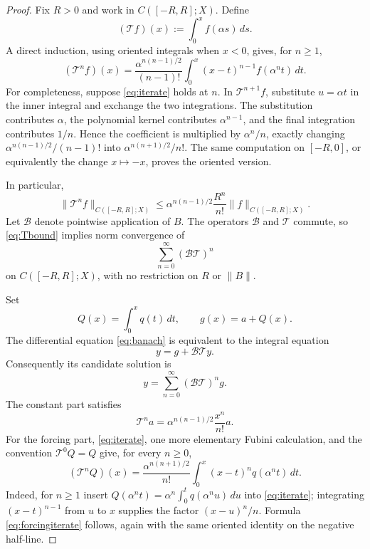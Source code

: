 \documentclass[11pt]{article}
\newcommand{\Bcal}{\mathcal B}
\newcommand{\Tcal}{\mathcal T}
\begin{document}
\begin{proof}
Fix $R>0$ and work in $C([-R,R];X)$.  Define
\[
 (\Tcal f)(x):=\int_0^x f(\alpha s)\,ds.
\]
A direct induction, using oriented integrals when $x<0$, gives, for $n\geq1$,
\begin{equation}\label{eq:iterate}
 (\Tcal^n f)(x)=
 \frac{\alpha^{n(n-1)/2}}{(n-1)!}
 \int_0^x (x-t)^{n-1}f(\alpha^n t)\,dt.
\end{equation}
For completeness, suppose \eqref{eq:iterate} holds at $n$.  In
$\Tcal^{n+1}f$, substitute $u=\alpha t$ in the inner integral and exchange the
two integrations.  The substitution contributes $\alpha$, the polynomial
kernel contributes $\alpha^{n-1}$, and the final integration contributes
$1/n$.  Hence the coefficient is multiplied by $\alpha^n/n$, exactly changing
$\alpha^{n(n-1)/2}/(n-1)!$ into
$\alpha^{n(n+1)/2}/n!$.  The same computation on $[-R,0]$, or equivalently
the change $x\mapsto-x$, proves the oriented version.

In particular,
\begin{equation}\label{eq:Tbound}
 \|\Tcal^n f\|_{C([-R,R];X)}
 \leq \alpha^{n(n-1)/2}\frac{R^n}{n!}\|f\|_{C([-R,R];X)}.
\end{equation}
Let $\Bcal$ denote pointwise application of $B$.  The operators $\Bcal$ and
$\Tcal$ commute, so \eqref{eq:Tbound} implies norm convergence of
\[
 \sum_{n=0}^{\infty}(\Bcal\Tcal)^n
\]
on $C([-R,R];X)$, with no restriction on $R$ or $\|B\|$.

Set
\[
 Q(x)=\int_0^x q(t)\,dt,\qquad g(x)=a+Q(x).
\]
The differential equation \eqref{eq:banach} is equivalent to the integral
equation
\begin{equation}\label{eq:integral}
 y=g+\Bcal\Tcal y.
\end{equation}
Consequently its candidate solution is
\begin{equation}\label{eq:neumann}
 y=\sum_{n=0}^{\infty}(\Bcal\Tcal)^n g.
\end{equation}
The constant part satisfies
\begin{equation}\label{eq:constant}
 \Tcal^n a=\alpha^{n(n-1)/2}\frac{x^n}{n!}a.
\end{equation}
For the forcing part, \eqref{eq:iterate}, one more elementary Fubini
calculation, and the convention $\Tcal^0Q=Q$ give, for every $n\geq0$,
\begin{equation}\label{eq:forcingiterate}
 (\Tcal^nQ)(x)=
 \frac{\alpha^{n(n+1)/2}}{n!}
 \int_0^x (x-t)^n q(\alpha^n t)\,dt.
\end{equation}
Indeed, for $n\geq1$ insert
$Q(\alpha^n t)=\alpha^n\int_0^t q(\alpha^n u)\,du$ into
\eqref{eq:iterate}; integrating $(x-t)^{n-1}$ from $u$ to $x$ supplies the
factor $(x-u)^n/n$.  Formula \eqref{eq:forcingiterate} follows, again with the
same oriented identity on the negative half-line.


\end{proof}
\end{document}
